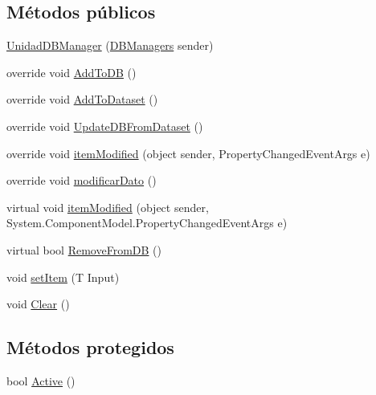 \subsection*{Métodos públicos}
\begin{DoxyCompactItemize}
\item 
\hyperlink{class_proyecto___integrador__3_1_1_d_b_managers_1_1_unidad_d_b_manager_aa06a0fc7edc0eaa6e506f5ab4fdf1bea}{Unidad\-D\-B\-Manager} (\hyperlink{class_proyecto___integrador__3_1_1_d_b_managers}{D\-B\-Managers} sender)
\item 
override void \hyperlink{class_proyecto___integrador__3_1_1_d_b_managers_1_1_unidad_d_b_manager_a7ab559a77f8d4a8f7f3677331b062dc8}{Add\-To\-D\-B} ()
\item 
override void \hyperlink{class_proyecto___integrador__3_1_1_d_b_managers_1_1_unidad_d_b_manager_aedd457fc6ac509e785ef85c448ceb04c}{Add\-To\-Dataset} ()
\item 
override void \hyperlink{class_proyecto___integrador__3_1_1_d_b_managers_1_1_unidad_d_b_manager_a4161021ecc4778c81b88592d0cb1d23b}{Update\-D\-B\-From\-Dataset} ()
\item 
override void \hyperlink{class_proyecto___integrador__3_1_1_d_b_managers_1_1_unidad_d_b_manager_a6bb4bb23daece7094f9d29c3650dc02e}{item\-Modified} (object sender, Property\-Changed\-Event\-Args e)
\item 
override void \hyperlink{class_proyecto___integrador__3_1_1_d_b_managers_1_1_unidad_d_b_manager_a06b95538d895923d0a3b780fdde83e06}{modificar\-Dato} ()
\item 
virtual void \hyperlink{class_proyecto___integrador__3_1_1_d_b_managers_1_1_d_b_manager_3_01_t_01_4_a49ea2a7bfa58a2c536fefa4d60d488d2}{item\-Modified} (object sender, System.\-Component\-Model.\-Property\-Changed\-Event\-Args e)
\item 
virtual bool \hyperlink{class_proyecto___integrador__3_1_1_d_b_managers_1_1_d_b_manager_3_01_t_01_4_a436cb08914ca84122f9019a59485589a}{Remove\-From\-D\-B} ()
\item 
void \hyperlink{class_proyecto___integrador__3_1_1_d_b_managers_1_1_d_b_manager_3_01_t_01_4_a2d552a5e547efd19924ca4a96f685a56}{set\-Item} (T Input)
\item 
void \hyperlink{class_proyecto___integrador__3_1_1_d_b_managers_1_1_d_b_manager_3_01_t_01_4_ad5d7f99a4a5783514bad64ba8894e1ea}{Clear} ()
\end{DoxyCompactItemize}
\subsection*{Métodos protegidos}
\begin{DoxyCompactItemize}
\item 
bool \hyperlink{class_proyecto___integrador__3_1_1_d_b_managers_1_1_d_b_manager_3_01_t_01_4_add66e324cef43fd10b491bc697fa60b5}{Active} ()
\end{DoxyCompactItemize}
